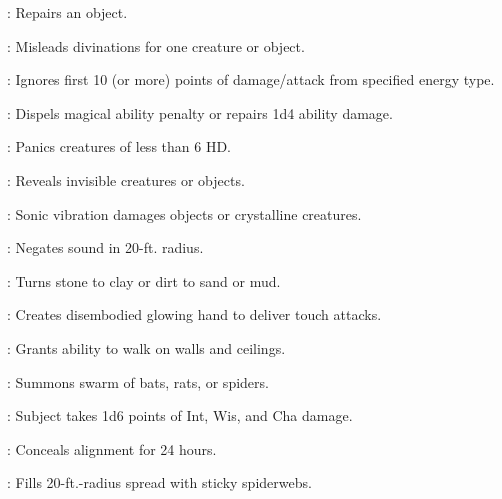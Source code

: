 \begin{multicols}{2}
\begin{description*}
\item[\linkspell{Make Whole}:] Repairs an object.
\item[\linkspell{Misdirection}:] Misleads divinations for one creature or object.
\item[\linkspell{Resist Energy}:] Ignores first 10 (or more) points of damage/attack from specified energy type.
\item[\linkspell{Restoration, Lesser}:] Dispels magical ability penalty or repairs 1d4 ability damage.
\item[\linkspell{Scare}:] Panics creatures of less than 6 HD.
\item[\linkspell{See Invisibility}:] Reveals invisible creatures or objects.
\item[\linkspell{Shatter}:] Sonic vibration damages objects or crystalline creatures.
\item[\linkspell{Silence}:] Negates sound in 20-ft. radius.
\item[\linkspell{Soften Earth and Stone}:] Turns stone to clay or dirt to sand or mud.
\item[\linkspell{Spectral Hand}:] Creates disembodied glowing hand to deliver touch attacks.
\item[\linkspell{Spider Climb}:] Grants ability to walk on walls and ceilings.
\item[\linkspell{Summon Swarm}:] Summons swarm of bats, rats, or spiders.
\item[\linkspell{Touch of Idiocy}:] Subject takes 1d6 points of Int, Wis, and Cha damage.
\item[\linkspell{Undetectable Alignment}:] Conceals alignment for 24 hours.
\item[\linkspell{Web}:] Fills 20-ft.-radius spread with sticky spiderwebs.
\end{description*}


\end{multicols}
